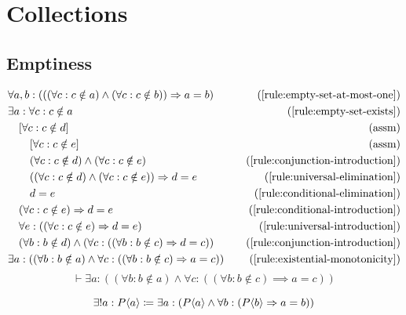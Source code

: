 \section{Collections}
\label{sec:sets}

\subsection{Emptiness}

\begin{align*}
    \byrule{\forall a, b: (((\forall c: c \notin a) \wedge (\forall c: c \notin b)) \implies a = b)}{\ref{rule:empty-set-at-most-one}}\\
    \byrule{\exists a: \forall c: c \notin a}{\ref{rule:empty-set-exists}}\\
    \assumption[1]{\forall c: c \notin d}\\
    \assumption[2]{\forall c: c \notin e}\\
    \byrule[2]{(\forall c: c \notin d) \wedge (\forall c: c \notin e)}{\ref{rule:conjunction-introduction}}\\
    \byrule[2]{((\forall c: c \notin d) \wedge (\forall c: c \notin e)) \implies d = e}{\ref{rule:universal-elimination}}\\
    \byrule[2]{d = e}{\ref{rule:conditional-elimination}}\\
    \byrule[1]{(\forall c: c \notin e) \implies d = e}{\ref{rule:conditional-introduction}}\\
    \byrule[1]{\forall e: ((\forall c: c \notin e) \implies d = e)}{\ref{rule:universal-introduction}}\\
    \byrule[1]{(\forall b: b \notin d) \wedge (\forall c: ((\forall b: b \notin c) \implies d = c))}{\ref{rule:conjunction-introduction}}\\
    \byrule{\exists a: ((\forall b: b \notin a) \wedge \forall c: ((\forall b: b \notin c) \implies a = c))}{\ref{rule:existential-monotonicity}}
\end{align*}
\begin{equation}
    \vdash \exists a: ((\forall b: b \notin a) \wedge \forall c: ((\forall b: b \notin c) \implies a = c))
    \label{rule:empty-set-unique}
\end{equation}

\begin{notation}
    \[\exists! a: P\bound{a} \coloneqq \exists a: (P\bound{a} \wedge \forall b: (P\bound{b} \implies a = b))\]
\end{notation}


